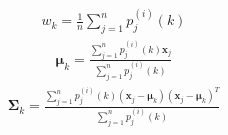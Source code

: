 \documentclass[letterpaper,10pt,english]{jupyterBook}
\begin{document}
\begin{equation*}
\begin{split}w_k = \frac1n\displaystyle\sum_{j=1}^n p_j^{(i)}(k)\end{split}
\end{equation*}\begin{equation*}
\begin{split}\boldsymbol\mu_k = \frac{\displaystyle\sum_{j=1}^n p_j^{(i)}(k) \mathbf x_j}{\displaystyle\sum_{j=1}^n p_j^{(i)}(k)}\end{split}
\end{equation*}\begin{equation*}
\begin{split}\boldsymbol\Sigma_{k} = \frac{\displaystyle\sum_{j=1}^n p_j^{(i)}(k) (\mathbf x_j-\boldsymbol\mu_k)(\mathbf x_j-\boldsymbol\mu_k)^T}{\displaystyle\sum_{j=1}^n p_j^{(i)}(k)}\end{split}
\end{equation*}
\end{document}
